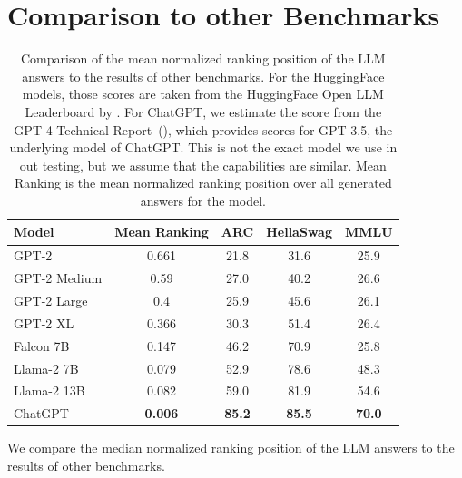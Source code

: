 \section{Comparison to other Benchmarks}\label{sec:benchmark_comparison}
\begin{table}[tb]
    \centering
    \begin{tabularx}{\textwidth}{lcccc}
    \hline
    \textbf{Model} & \textbf{Mean Ranking} & \textbf{ARC}  & \textbf{HellaSwag} & \textbf{MMLU} \\\hline
    GPT-2          & 0.661                             & 21.8          & 31.6               & 25.9          \\
    GPT-2 Medium   & 0.59                              & 27.0          & 40.2               & 26.6          \\
    GPT-2 Large    & 0.4                               & 25.9          & 45.6               & 26.1          \\
    GPT-2 XL       & 0.366                             & 30.3          & 51.4               & 26.4          \\
    Falcon 7B      & 0.147                             & 46.2          & 70.9               & 25.8          \\
    Llama-2 7B     & 0.079                             & 52.9          & 78.6               & 48.3          \\
    Llama-2 13B    & 0.082                             & 59.0          & 81.9               & 54.6          \\
    ChatGPT        & \textbf{0.006}                    & \textbf{85.2} & \textbf{85.5}      & \textbf{70.0} \\
    \hline
    \end{tabularx}
    \caption{Comparison of the mean normalized ranking position of the LLM answers to the results of other benchmarks.
    For the HuggingFace models, those scores are taken from the HuggingFace Open LLM Leaderboard by \cite{beeching:2023:Open}.
    For ChatGPT, we estimate the score from the GPT-4 Technical Report~(\cite{openai:2023:GPT}), which provides scores for GPT-3.5, the underlying model of ChatGPT.
    This is not the exact model we use in out testing, but we assume that the capabilities are similar.
    Mean Ranking is the mean normalized ranking position over all generated answers for the model.
    }
    \label{tab:benchmark_comparison}
\end{table}
We compare the median normalized ranking position of the LLM answers to the results of other benchmarks.
